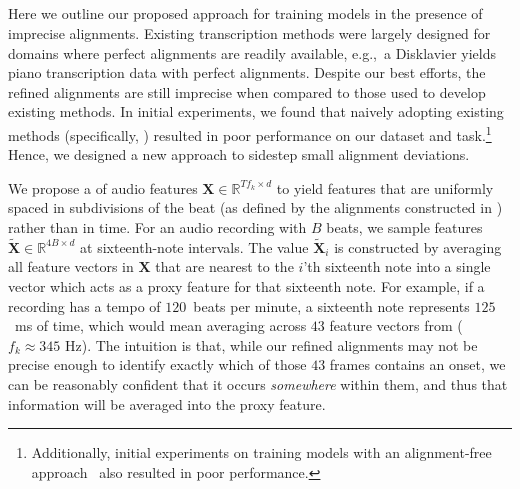 \subsection{\Beatpooling}
\label{sec:beatpool}

Here we outline our proposed approach for training models in the presence of imprecise alignments. 
Existing transcription methods were largely designed for domains where perfect alignments are readily available, e.g.,~a Disklavier yields piano transcription data with perfect alignments. 
Despite our best efforts, the refined \hooktheory{} alignments are still imprecise when compared to those used to develop existing methods. 
In initial experiments, we found that naively adopting existing methods (specifically, \cite{hawthorne2017onsets,hawthorne2021sequence}) resulted in poor performance on our dataset and task.\footnote{Additionally, initial experiments on training models with an alignment-free approach~\cite{graves2006connectionist} also resulted in poor performance.} 
Hence, we designed a new approach to sidestep small alignment deviations.

We propose a \emph{\beatpooling} of audio features $\bm{X} \in \mathbb{R}^{Tf_k \times d}$ to yield features that are uniformly spaced in subdivisions of the beat (as defined by the alignments constructed in ) rather than in time. 
For an audio recording with $B$ beats, we sample features $\tilde{\bm{X}} \in \mathbb{R}^{4B \times d}$ at sixteenth-note intervals. The value $\tilde{\bm{X}}_i$ is constructed by averaging all feature vectors in $\bm{X}$ that are nearest to the $i$'th sixteenth note into a single vector which acts as a proxy feature for that sixteenth note. 
For example, if a recording has a tempo of $120$~beats per minute, a sixteenth note represents $125$~ms of time, which would mean averaging across 
$43$ feature vectors from \jukebox{} (${f_k \approx 345}$ Hz). 
The intuition is that, while our refined alignments may not be precise enough to identify exactly which of those $43$ frames contains an onset, we can be reasonably confident that it occurs \emph{somewhere} within them, and thus that information will be averaged into the proxy feature.

